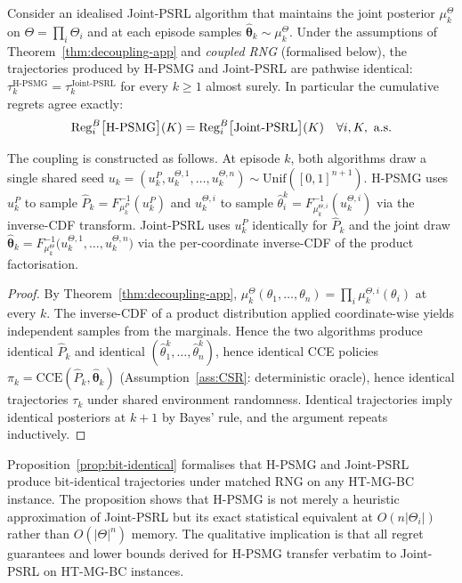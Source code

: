 \begin{proposition}
\label{prop:bit-identical}
Consider an idealised Joint-PSRL algorithm that maintains the joint posterior $\mu_k^\Theta$ on $\Theta = \prod_i \Theta_i$ and at each episode samples $\hat{\boldsymbol\theta}_k \sim \mu_k^\Theta$. Under the assumptions of Theorem~\ref{thm:decoupling-app} and \emph{coupled RNG} (formalised below), the trajectories produced by H-PSMG and Joint-PSRL are pathwise identical: $\tau_k^{\mathrm{H\text{-}PSMG}} = \tau_k^{\mathrm{Joint\text{-}PSRL}}$ for every $k \geq 1$ almost surely. In particular the cumulative regrets agree exactly:
\begin{equation}
\mathrm{Reg}_i^B\big[\textnormal{H-PSMG}\big](K) = \mathrm{Reg}_i^B\big[\textnormal{Joint-PSRL}\big](K) \quad \forall i, K, \text{ a.s.}
\end{equation}

The coupling is constructed as follows. At episode $k$, both algorithms draw a single shared seed $u_k = (u_k^P, u_k^{\Theta, 1}, \ldots, u_k^{\Theta, n}) \sim \mathrm{Unif}([0,1]^{n+1})$. H-PSMG uses $u_k^P$ to sample $\hat P_k = F_{\mu_k^P}^{-1}(u_k^P)$ and $u_k^{\Theta, i}$ to sample $\hat\theta_i^k = F_{\mu_k^{\Theta, i}}^{-1}(u_k^{\Theta, i})$ via the inverse-CDF transform. Joint-PSRL uses $u_k^P$ identically for $\hat P_k$ and the joint draw $\hat{\boldsymbol\theta}_k = F_{\mu_k^\Theta}^{-1}\big(u_k^{\Theta, 1}, \ldots, u_k^{\Theta, n}\big)$ via the per-coordinate inverse-CDF of the product factorisation.
\end{proposition}

\begin{proof}
By Theorem~\ref{thm:decoupling-app}, $\mu_k^\Theta(\theta_1, \ldots, \theta_n) = \prod_i \mu_k^{\Theta, i}(\theta_i)$ at every $k$. The inverse-CDF of a product distribution applied coordinate-wise yields independent samples from the marginals. Hence the two algorithms produce identical $\hat P_k$ and identical $(\hat\theta_1^k, \ldots, \hat\theta_n^k)$, hence identical CCE policies $\pi_k = \mathrm{CCE}(\hat P_k, \hat{\boldsymbol\theta}_k)$ (Assumption~\ref{ass:CSR}: deterministic oracle), hence identical trajectories $\tau_k$ under shared environment randomness. Identical trajectories imply identical posteriors at $k+1$ by Bayes' rule, and the argument repeats inductively.
\end{proof}

Proposition~\ref{prop:bit-identical} formalises that H-PSMG and Joint-PSRL produce bit-identical trajectories under matched RNG on any HT-MG-BC instance. The proposition shows that H-PSMG is not merely a heuristic approximation of Joint-PSRL but its exact statistical equivalent at $O(n|\Theta_i|)$ rather than $O(|\Theta|^n)$ memory. The qualitative implication is that all regret guarantees and lower bounds derived for H-PSMG transfer verbatim to Joint-PSRL on HT-MG-BC instances.

